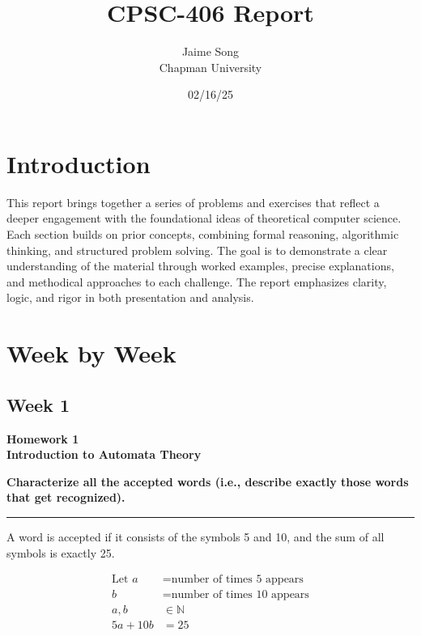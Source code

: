 \documentclass{article}
\title{CPSC-406 Report}
\author{Jaime Song  \\ Chapman University}
\date{02/16/25}
\theoremstyle{theorem}
\theoremstyle{definition}
\theoremstyle{remark}
\begin{document}
\maketitle

\begin{abstract}
\end{abstract}

\setcounter{tocdepth}{3}
\tableofcontents

\section{Introduction}\label{intro}
This report brings together a series of problems and exercises that reflect a deeper engagement with the foundational ideas of theoretical computer science. Each section builds on prior concepts, combining formal reasoning, algorithmic thinking, and structured problem solving. The goal is to demonstrate a clear understanding of the material through worked examples, precise explanations, and methodical approaches to each challenge. The report emphasizes clarity, logic, and rigor in both presentation and analysis.


\section{Week by Week}\label{homework}

\subsection{Week 1}
\textbf{Homework 1}\\
\textbf{Introduction to Automata Theory}\\

\vspace{0.5em}

\textbf{Characterize all the accepted words (i.e., describe exactly those words that get recognized).}

\vspace{0.5em}
\hrule
\vspace{0.5em}

A word is accepted if it consists of the symbols 5 and 10, and the sum of all symbols is exactly 25.

\begin{align*}
    \text{Let } a &= \text{number of times 5 appears} \\
    b &= \text{number of times 10 appears} \\
    a, b &\in \mathbb{N} \\
    5a + 10b &= 25
\end{align*}
\end{document}

